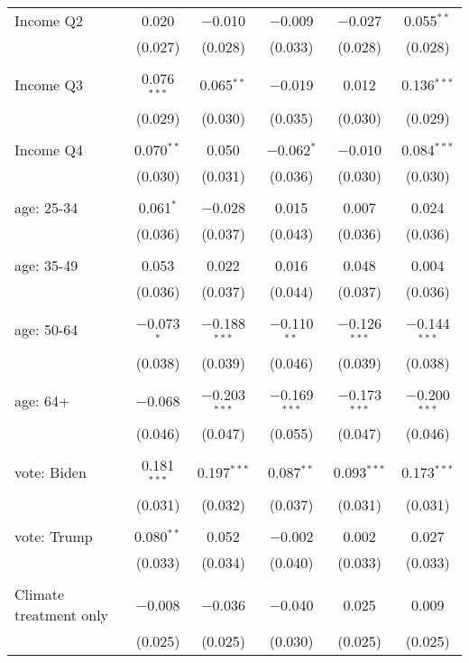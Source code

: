 \begin{tabular}{@{\extracolsep{5pt}}lccccc}
 Income Q2 & 0.020 & $-$0.010 & $-$0.009 & $-$0.027 & 0.055$^{**}$ \\ 
  & (0.027) & (0.028) & (0.033) & (0.028) & (0.028) \\ 
  & & & & & \\ 
 Income Q3 & 0.076$^{***}$ & 0.065$^{**}$ & $-$0.019 & 0.012 & 0.136$^{***}$ \\ 
  & (0.029) & (0.030) & (0.035) & (0.030) & (0.029) \\ 
  & & & & & \\ 
 Income Q4 & 0.070$^{**}$ & 0.050 & $-$0.062$^{*}$ & $-$0.010 & 0.084$^{***}$ \\ 
  & (0.030) & (0.031) & (0.036) & (0.030) & (0.030) \\ 
  & & & & & \\ 
 age: 25-34 & 0.061$^{*}$ & $-$0.028 & 0.015 & 0.007 & 0.024 \\ 
  & (0.036) & (0.037) & (0.043) & (0.036) & (0.036) \\ 
  & & & & & \\ 
 age: 35-49 & 0.053 & 0.022 & 0.016 & 0.048 & 0.004 \\ 
  & (0.036) & (0.037) & (0.044) & (0.037) & (0.036) \\ 
  & & & & & \\ 
 age: 50-64 & $-$0.073$^{*}$ & $-$0.188$^{***}$ & $-$0.110$^{**}$ & $-$0.126$^{***}$ & $-$0.144$^{***}$ \\ 
  & (0.038) & (0.039) & (0.046) & (0.039) & (0.038) \\ 
  & & & & & \\ 
 age: 64+ & $-$0.068 & $-$0.203$^{***}$ & $-$0.169$^{***}$ & $-$0.173$^{***}$ & $-$0.200$^{***}$ \\ 
  & (0.046) & (0.047) & (0.055) & (0.047) & (0.046) \\ 
  & & & & & \\ 
 vote: Biden & 0.181$^{***}$ & 0.197$^{***}$ & 0.087$^{**}$ & 0.093$^{***}$ & 0.173$^{***}$ \\ 
  & (0.031) & (0.032) & (0.037) & (0.031) & (0.031) \\ 
  & & & & & \\ 
 vote: Trump & 0.080$^{**}$ & 0.052 & $-$0.002 & 0.002 & 0.027 \\ 
  & (0.033) & (0.034) & (0.040) & (0.033) & (0.033) \\ 
  & & & & & \\ 
 Climate treatment only & $-$0.008 & $-$0.036 & $-$0.040 & 0.025 & 0.009 \\ 
  & (0.025) & (0.025) & (0.030) & (0.025) & (0.025) \\ 

\end{tabular}

